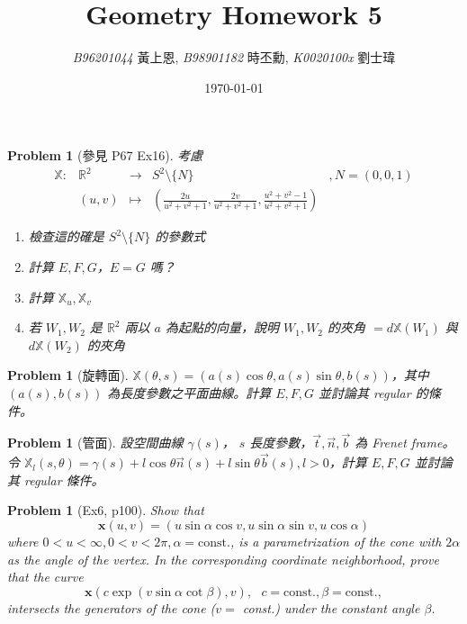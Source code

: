 \documentclass[10pt,a4paper]{article}
\newcommand{\LiHei}{\CJKfamily{lh}}
\newcounter{theProblemCounter}
\newtheorem{problem}[theProblemCounter]{Problem}
\begin{document}
\title{{Geometry Homework 5}}
\author{{\it{B96201044}} {\LiHei 黃上恩}, {\it{B98901182}} {\LiHei 時丕勳}, {\it{K0020100x}} {\LiHei 劉士瑋}}
\date{\today}
\maketitle

\setcounter{theProblemCounter}{0}
\begin{problem}[參見 P67 Ex16]
考慮
\[
\begin{array}{ccccc}
\mathbb{X}: & \mathbb{R}^2 & \to & S^2\setminus \{N\} & , N=(0,0,1) \\
& (u, v) & \mapsto & \left(\frac{2u}{u^2+v^2+1}, \frac{2v}{u^2+v^2+1},\frac{u^2+v^2-1}{u^2+v^2+1}\right) &
\end{array}
\]

\begin{enumerate}
\item[(a)] 檢查這的確是 $S^2\setminus \{N\}$ 的參數式
\item[(b)] 計算 $E, F, G$，$E=G$ 嗎？
\item[(c)] 計算 $\mathbb{X}_u, \mathbb{X}_v$
\item[(d)] 若 $W_1, W_2$ 是 $\mathbb{R}^2$ 兩以 $a$ 為起點的向量，說明 $W_1, W_2$ 的夾角 $=d\mathbb{X}(W_1)$ 與 $d\mathbb{X}(W_2)$ 的夾角
\end{enumerate}
\end{problem}

\setcounter{theProblemCounter}{1}
\begin{problem}[旋轉面]
$\mathbb{X}(\theta, s)=(a(s)\cos\theta, a(s)\sin\theta, b(s))$，其中 $(a(s), b(s))$ 為長度參數之平面曲線。計算 $E, F, G$ 並討論其 regular 的條件。
\end{problem}

\setcounter{theProblemCounter}{2}
\begin{problem}[管面]
設空間曲線 $\gamma(s)$， $s$ 長度參數，$\vec{t}, \vec{n}, \vec{b}$ 為 Frenet frame。令 $\mathbb{X}_l(s,\theta)=\gamma(s)+l\cos\theta\vec{n}(s) + l\sin\theta\vec{b}(s), l>0$，計算 $E, F, G$ 並討論其 regular 條件。
\end{problem}

\setcounter{theProblemCounter}{5}
\begin{problem}[Ex6, p100]
Show that
\[ \mathbf{x}(u, v) = (u\sin\alpha\cos v, u\sin\alpha\sin v, u\cos\alpha)
\]
where $0<u<\infty, 0<v<2\pi, \alpha=\mbox{const.}$,
is a parametrization of the cone with $2\alpha$ as the angle of the vertex. In the corresponding coordinate neighborhood, prove that the curve
\[
\mathbf{x}(c\exp(v\sin\alpha \cot \beta), v),\ \ \ c=\mbox{const.}, \beta = \mbox{const.},
\]
intersects the generators of the cone ($v=$ const.) under the constant angle $\beta$.
\end{problem}
\end{document}
